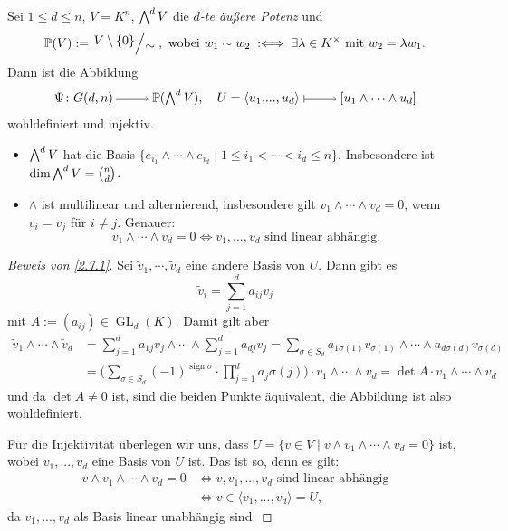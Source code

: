 \documentclass[a4paper,12pt,index=toc]{scrbook}
\theoremstyle{keinenummern} %
\def\P{\mathbb{P}}
\newcommand{\GL}{\operatorname{GL}}
\newcommand{\sign}{\operatorname{sign}}
\renewcommand{\dotsc}{\ensuremath{\!...}}
\newcommand{\schlange}[1]{\widetilde{#1}}
\let\grassmann\bigwedge
\def\bigwedge{\begingroup\textstyle\grassmann\endgroup}
\begin{document}
\begin{db}\label{2.7.1}
Sei $1\leq d\leq n$, $V=K^{n}$, $\bigwedge^{d}V$ die \emph{$d$-te äußere Potenz} und
\begin{equation*}\P(V):=\Quotient{V\setminus\{0\}}{\sim},\text{ wobei }w_{1}\sim w_{2}\; :\Longleftrightarrow\;\exists\lambda\in K^{\times}\text{ mit }w_{2}=\lambda w_{1}.\end{equation*}
Dann ist die Abbildung
\begin{equation*}\Psi\colon G(d,n)\ra\P(\bigwedge^{d}V),\quad U=\langle u_{1},\dotsc,u_{d}\rangle\mapsto\relax [u_{1}\wedge\dotsm\wedge u_{d}]\end{equation*}
wohldefiniert und injektiv.
\end{db}

\begin{nerinnerung}\begin{itemize}[leftmargin=*,labelindent=\parindent]
\item $\bigwedge^{d}V$ hat die Basis $\{e_{i_{1}}\wedge\dotsm\wedge e_{i_{d}}\mid 1\leq i_{1}<\dotsm<i_{d}\leq n\}$.
Insbesondere ist $\dim\bigwedge^{d}V=\binom{n}{d}$.
%
\item $\wedge$ ist multilinear und alternierend, insbesondere gilt $v_{1}\wedge\dotsm\wedge v_{d}=0$, wenn $v_{i}=v_{j}$ für $i\neq j$. Genauer:
\begin{equation*}v_{1}\wedge\dotsm\wedge v_{d}=0\iff v_{1},\dotsc, v_{d}\text{ sind linear abhängig.}\end{equation*}
\end{itemize}\end{nerinnerung}

\begin{proof}[Beweis von \cref{2.7.1}]
Sei $\schlange{v}_{1},\dotsm,\schlange{v}_{d}$ eine andere Basis von $U$. Dann gibt es
\begin{equation*}\schlange{v}_{i}=\sum_{j=1}^{d}a_{ij}v_{j}\end{equation*}
mit $A:=(a_{ij})\in\GL_{d}(K)$. Damit gilt aber
\begin{align*}
\schlange{v}_{1}\wedge\dotsm\wedge\schlange{v}_{d}&=\sum_{j=1}^{d}a_{1j}v_{j}\wedge\dotsm\wedge\sum_{j=1}^{d}a_{dj}v_{j}=\sum_{\sigma\in S_{d}}a_{1\sigma(1)}v_{\sigma(1)}\wedge\dotsm\wedge a_{d\sigma(d)}v_{\sigma(d)}\\
&=\biggl(\sum_{\sigma\in S_{d}}(-1)^{\sign\sigma}\cdot\prod_{j=1}^{d}a_{j}\sigma(j)\biggr)\cdot v_{1}\wedge\dotsm\wedge v_{d}=\det A\cdot v_{1}\wedge\dotsm\wedge v_{d}
\end{align*}
und da $\det A\neq 0$ ist, sind die beiden Punkte äquivalent, die Abbildung ist also wohldefiniert.

Für die Injektivität überlegen wir uns, dass $U=\{v\in V\mid v\wedge v_{1}\wedge\dotsm\wedge v_{d}=0\}$ ist, wobei $v_{1},\dotsc, v_{d}$ eine Basis von $U$ ist. Das ist so, denn es gilt:
\begin{align*}
v\wedge v_{1}\wedge\dotsm\wedge v_{d}=0&\iff v,v_{1},\dotsc,v_{d}\text{ sind linear abhängig}\\
&\iff v\in\langle v_{1},\dotsc,v_{d}\rangle=U,
\end{align*}
da $v_{1},\dotsc,v_{d}$ als Basis linear unabhängig sind.
\end{proof}
\end{document}
